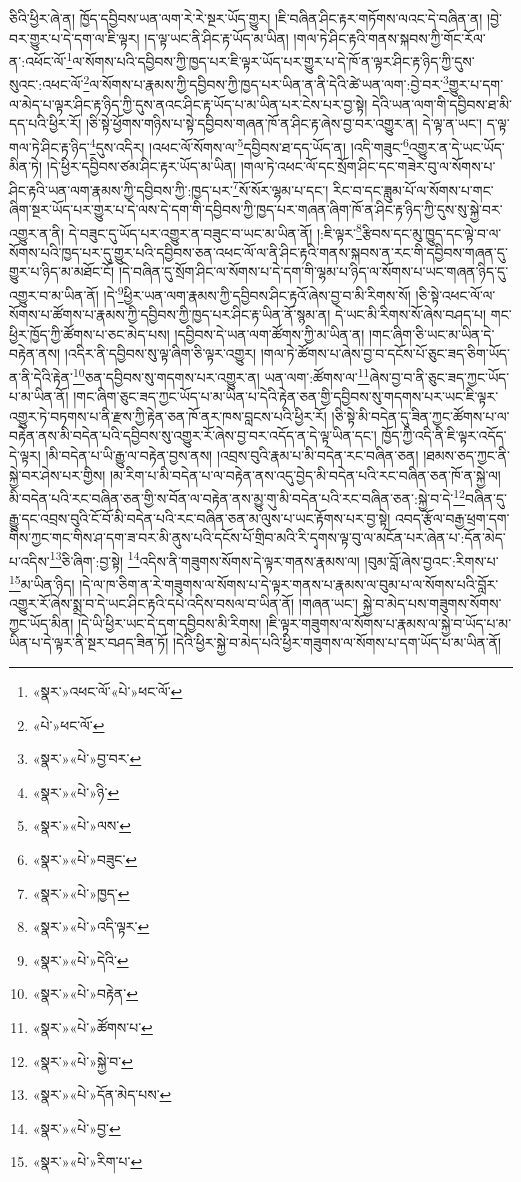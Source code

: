 ཅིའི་ཕྱིར་ཞེ་ན། ཁྱོད་དབྱིབས་ཡན་ལག་རེ་རེ་སྔར་ཡོད་གྱུར། །ཇི་བཞིན་ཤིང་རྟར་གཏོགས་ལའང་དེ་བཞིན་ན། །བྱེ་བར་གྱུར་པ་དེ་དག་ལ་ཇི་ལྟར། །ད་ལྟ་ཡང་ནི་ཤིང་རྟ་ཡོད་མ་ཡིན། །གལ་ཏེ་ཤིང་རྟའི་གནས་སྐབས་ཀྱི་གོང་རོལ་ན་:འཕོང་ལོ་\footnote{«སྣར་»འཕང་ལོ་«པེ་»ཕང་ལོ་}ལ་སོགས་པའི་དབྱིབས་ཀྱི་ཁྱད་པར་ཇི་ལྟར་ཡོད་པར་གྱུར་པ་དེ་ཁོ་ན་ལྟར་ཤིང་རྟ་ཉིད་ཀྱི་དུས་སུའང་:འཕང་ལོ་\footnote{«པེ་»ཕང་ལོ་}ལ་སོགས་པ་རྣམས་ཀྱི་དབྱིབས་ཀྱི་ཁྱད་པར་ཡིན་ན་ནི་དེའི་ཚེ་ཡན་ལག་:བྱེ་བར་\footnote{«སྣར་»«པེ་»བྱ་བར་}གྱུར་པ་དག་ལ་མེད་པ་ལྟར་ཤིང་རྟ་ཉིད་ཀྱི་དུས་ནའང་ཤིང་རྟ་ཡོད་པ་མ་ཡིན་པར་ངེས་པར་བྱ་སྟེ། དེའི་ཡན་ལག་གི་དབྱིབས་ཐ་མི་དད་པའི་ཕྱིར་རོ། །ཅི་སྟེ་ཕྱོགས་གཉིས་པ་སྟེ་དབྱིབས་གཞན་ཁོ་ན་ཤིང་རྟ་ཞེས་བྱ་བར་འགྱུར་ན། དེ་ལྟ་ན་ཡང་། ད་ལྟ་གལ་ཏེ་ཤིང་རྟ་ཉིད་\footnote{«སྣར་»«པེ་»ཉི་}དུས་འདིར། །འཕང་ལོ་སོགས་ལ་\footnote{«སྣར་»«པེ་»ལས་}དབྱིབས་ཐ་དད་ཡོད་ན། །འདི་གཟུང་\footnote{«སྣར་»«པེ་»བཟུང་}འགྱུར་ན་དེ་ཡང་ཡོད་མིན་ཏེ། །དེ་ཕྱིར་དབྱིབས་ཙམ་ཤིང་རྟར་ཡོད་མ་ཡིན། །གལ་ཏེ་འཕང་ལོ་དང་སྲོག་ཤིང་དང་གཟེར་བུ་ལ་སོགས་པ་ཤིང་རྟའི་ཡན་ལག་རྣམས་ཀྱི་དབྱིབས་ཀྱི་:ཁྱད་པར་\footnote{«སྣར་»«པེ་»ཁྱད་}སོ་སོར་ལྷམ་པ་དང་། རིང་བ་དང་ཟླུམ་པོ་ལ་སོགས་པ་གང་ཞིག་སྔར་ཡོད་པར་གྱུར་པ་དེ་ལས་དེ་དག་གི་དབྱིབས་ཀྱི་ཁྱད་པར་གཞན་ཞིག་ཁོ་ན་ཤིང་རྟ་ཉིད་ཀྱི་དུས་སུ་སྐྱེ་བར་འགྱུར་ན་ནི། དེ་བཟུང་དུ་ཡོད་པར་འགྱུར་ན་བཟུང་བ་ཡང་མ་ཡིན་ནོ། །:ཇི་ལྟར་\footnote{«སྣར་»«པེ་»འདི་ལྟར་}རྩིབས་དང་མུ་ཁྱུད་དང་ལྟེ་བ་ལ་སོགས་པའི་ཁྱད་པར་དུ་གྱུར་པའི་དབྱིབས་ཅན་འཕང་ལོ་ལ་ནི་ཤིང་རྟའི་གནས་སྐབས་ན་རང་གི་དབྱིབས་གཞན་དུ་གྱུར་པ་ཉིད་མ་མཐོང་ངོ། །དེ་བཞིན་དུ་སྲོག་ཤིང་ལ་སོགས་པ་དེ་དག་གི་ལྷམ་པ་ཉིད་ལ་སོགས་པ་ཡང་གཞན་ཉིད་དུ་འགྱུར་བ་མ་ཡིན་ནོ། །དེ་\footnote{«སྣར་»«པེ་»དེའི་}ཕྱིར་ཡན་ལག་རྣམས་ཀྱི་དབྱིབས་ཤིང་རྟའོ་ཞེས་བྱ་བ་མི་རིགས་སོ། །ཅི་སྟེ་འཕང་ལོ་ལ་སོགས་པ་ཚོགས་པ་རྣམས་ཀྱི་དབྱིབས་ཀྱི་ཁྱད་པར་ཤིང་རྟ་ཡིན་ནོ་སྙམ་ན། དེ་ཡང་མི་རིགས་སོ་ཞེས་བཤད་པ། གང་ཕྱིར་ཁྱོད་ཀྱི་ཚོགས་པ་ཅང་མེད་པས། །དབྱིབས་དེ་ཡན་ལག་ཚོགས་ཀྱི་མ་ཡིན་ན། །གང་ཞིག་ཅི་ཡང་མ་ཡིན་དེ་བརྟེན་ནས། །འདིར་ནི་དབྱིབས་སུ་ལྟ་ཞིག་ཅི་ལྟར་འགྱུར། །གལ་ཏེ་ཚོགས་པ་ཞེས་བྱ་བ་དངོས་པོ་ཅུང་ཟད་ཅིག་ཡོད་ན་ནི་དེའི་རྟེན་\footnote{«སྣར་»«པེ་»བརྟེན་}ཅན་དབྱིབས་སུ་གདགས་པར་འགྱུར་ན། ཡན་ལག་:ཚོགས་ལ་\footnote{«སྣར་»«པེ་»ཚོགས་པ་}ཞེས་བྱ་བ་ནི་ཅུང་ཟད་ཀྱང་ཡོད་པ་མ་ཡིན་ནོ། །གང་ཞིག་ཅུང་ཟད་ཀྱང་ཡོད་པ་མ་ཡིན་པ་དེའི་རྟེན་ཅན་གྱི་དབྱིབས་སུ་གདགས་པར་ཡང་ཇི་ལྟར་འགྱུར་ཏེ་བཏགས་པ་ནི་རྫས་ཀྱི་རྟེན་ཅན་ཁོ་ནར་ཁས་བླངས་པའི་ཕྱིར་རོ། །ཅི་སྟེ་མི་བདེན་དུ་ཟིན་ཀྱང་ཚོགས་པ་ལ་བརྟེན་ནས་མི་བདེན་པའི་དབྱིབས་སུ་འགྱུར་རོ་ཞེས་བྱ་བར་འདོད་ན་དེ་ལྟ་ཡིན་དང་། ཁྱོད་ཀྱི་འདི་ནི་ཇི་ལྟར་འདོད་དེ་ལྟར། །མི་བདེན་པ་ཡི་རྒྱུ་ལ་བརྟེན་བྱས་ནས། །འབྲས་བུའི་རྣམ་པ་མི་བདེན་རང་བཞིན་ཅན། །ཐམས་ཅད་ཀྱང་ནི་སྐྱེ་བར་ཤེས་པར་གྱིས། །མ་རིག་པ་མི་བདེན་པ་ལ་བརྟེན་ནས་འདུ་བྱེད་མི་བདེན་པའི་རང་བཞིན་ཅན་ཁོ་ན་སྐྱེ་ལ། མི་བདེན་པའི་རང་བཞིན་ཅན་གྱི་ས་བོན་ལ་བརྟེན་ནས་མྱུ་གུ་མི་བདེན་པའི་རང་བཞིན་ཅན་:སྐྱེ་བ་དེ་\footnote{«སྣར་»«པེ་»སྐྱེ་བ་}བཞིན་དུ་རྒྱུ་དང་འབྲས་བུའི་ངོ་བོ་མི་བདེན་པའི་རང་བཞིན་ཅན་མ་ལུས་པ་ཡང་རྟོགས་པར་བྱ་སྟེ། འབད་རྩོལ་བརྒྱ་ཕྲག་དག་གིས་ཀྱང་གང་གིས་ཤ་དག་ཟ་བར་མི་ནུས་པའི་དངོས་པོ་གྲིབ་མའི་རི་དྭགས་ལྟ་བུ་ལ་མངོན་པར་ཞེན་པ་:དོན་མེད་པ་འདིས་\footnote{«སྣར་»«པེ་»དོན་མེད་པས་}ཅི་ཞིག་:བྱ་སྟེ། \footnote{«སྣར་»«པེ་»བྱ་}འདིས་ནི་གཟུགས་སོགས་དེ་ལྟར་གནས་རྣམས་ལ། །བུམ་བློ་ཞེས་བྱའང་:རིགས་པ་\footnote{«སྣར་»«པེ་»རིག་པ་}མ་ཡིན་ཉིད། །དེ་ལ་ཁ་ཅིག་ན་རེ་གཟུགས་ལ་སོགས་པ་དེ་ལྟར་གནས་པ་རྣམས་ལ་བུམ་པ་ལ་སོགས་པའི་བློར་འགྱུར་རོ་ཞེས་སྨྲ་བ་དེ་ཡང་ཤིང་རྟའི་དཔེ་འདིས་བསལ་བ་ཡིན་ནོ། །གཞན་ཡང་། སྐྱེ་བ་མེད་པས་གཟུགས་སོགས་ཀྱང་ཡོད་མིན། །དེ་ཡི་ཕྱིར་ཡང་དེ་དག་དབྱིབས་མི་རིགས། །ཇི་ལྟར་གཟུགས་ལ་སོགས་པ་རྣམས་ལ་སྐྱེ་བ་ཡོད་པ་མ་ཡིན་པ་དེ་ལྟར་ནི་སྔར་བཤད་ཟིན་ཏོ། །དེའི་ཕྱིར་སྐྱེ་བ་མེད་པའི་ཕྱིར་གཟུགས་ལ་སོགས་པ་དག་ཡོད་པ་མ་ཡིན་ནོ། 